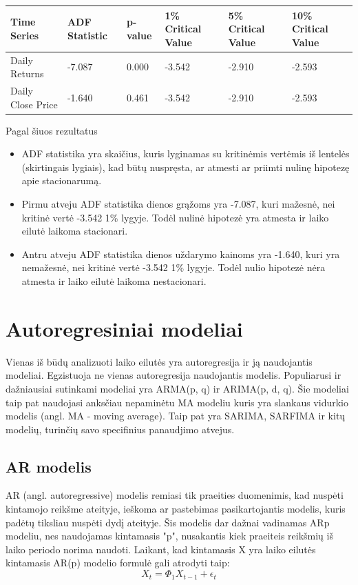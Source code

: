 \documentclass{VUMIFInfKursinis}
\begin{document}
\begin{tabularx}{\linewidth}{|X|X|X|X|X|X|}
  \hline
  \textbf{Time Series} & \textbf{ADF Statistic} & \textbf{p-value} & \textbf{1\% Critical Value} & \textbf{5\% Critical Value} & \textbf{10\% Critical Value} \\ \hline
  Daily Returns        & -7.087                 & 0.000            & -3.542                      & -2.910                      & -2.593                       \\ \hline
  Daily Close Price    & -1.640                 & 0.461            & -3.542                      & -2.910                      & -2.593                       \\ \hline
\end{tabularx}

\vspace{10pt}
Pagal šiuos rezultatus
\begin{itemize}
  \item ADF statistika yra skaičius, kuris lyginamas su kritinėmis vertėmis iš lentelės (skirtingais lygiais), kad būtų nuspręsta, ar atmesti ar priimti nulinę hipotezę apie stacionarumą.
  \item Pirmu atveju ADF statistika dienos grąžoms yra -7.087, kuri mažesnė, nei kritinė vertė -3.542 1\% lygyje. Todėl nulinė hipotezė yra atmesta ir laiko eilutė laikoma stacionari.
  \item Antru atveju ADF statistika dienos uždarymo kainoms yra -1.640, kuri yra nemažesnė, nei kritinė vertė -3.542 1\% lygyje. Todėl nulio hipotezė nėra atmesta ir laiko eilutė laikoma nestacionari.
\end{itemize}

\section{Autoregresiniai modeliai}
Vienas iš būdų analizuoti laiko eilutės yra autoregresija ir ją naudojantis modeliai. Egzistuoja ne vienas autoregresija naudojantis modelis. 
Populiarusi ir dažniausiai sutinkami modeliai yra ARMA(p, q) ir ARIMA(p, d, q).
Šie modeliai taip pat naudojasi anksčiau nepaminėtu MA modeliu kuris yra slankaus vidurkio modelis (angl. MA - moving average).
Taip pat yra SARIMA, SARFIMA ir kitų modelių, turinčių savo specifinius panaudjimo atvejus. 

\subsection{AR modelis}
AR (angl. autoregressive) modelis remiasi tik praeities duomenimis, kad nuspėti kintamojo reikšme ateityje, ieškoma ar pastebimas pasikartojantis
modelis, kuris padėtų tiksliau nuspėti dydį ateityje\cite{chi2018stock}. Šis modelis dar dažnai vadinamas ARp modeliu, nes naudojamas kintamasis "p", nusakantis kiek praeiteis reikšmių 
iš laiko periodo norima naudoti. Laikant, kad kintamasis X yra laiko eilutės kintamasis AR(p) modelio formulė gali atrodyti taip: 
\[X_{t} = \Phi _{1}X_{t-1}+\epsilon_{t} \]
\end{document}
